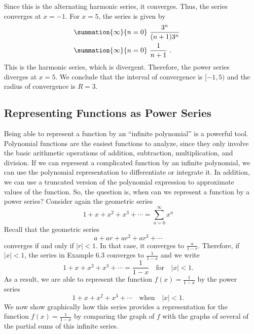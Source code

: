\documentclass{report}
\begin{document}
    \bigbreak \noindent 
    Since this is the alternating harmonic series, it converges. Thus, the series converges at  $x=-1$. For $x=5$, the series is given by
    \begin{align*}
        &\summation{\infty}{n=0}\ \frac{3^{n}}{(n+1)3^{n}}\  \\
        &\summation{\infty}{n=0}\ \frac{1}{n+1}\ 
    .\end{align*}
    This is the harmonic series, which is divergent. Therefore, the power series diverges at \( x = 5 \). We conclude that the interval of convergence is \([ -1, 5 )\) and the radius of convergence is \( R = 3 \).

    \bigbreak \noindent 
    \subsection*{Representing Functions as Power Series}
    \bigbreak \noindent 
    Being able to represent a function by an “infinite polynomial” is a powerful tool. Polynomial functions are the easiest functions to analyze, since they only involve the basic arithmetic operations of addition, subtraction, multiplication, and division. If we can represent a complicated function by an infinite polynomial, we can use the polynomial representation to differentiate or integrate it. In addition, we can use a truncated version of the polynomial expression to approximate values of the function. So, the question is, when can we represent a function by a power series?
    \bigbreak \noindent 
    Consider again the geometric series
\begin{equation}
    1 + x + x^2 + x^3 + \cdots = \sum_{n=0}^{\infty} x^n 
\end{equation}
Recall that the geometric series
\[
    a + ar + ar^2 + ar^3 + \cdots
\]
converges if and only if \( |r| < 1 \). In that case, it converges to \(\frac{a}{1 - r}\). Therefore, if \( |x| < 1 \), the series in Example 6.3 converges to \(\frac{1}{1 - x}\) and we write
\[
    1 + x + x^2 + x^3 + \cdots = \frac{1}{1 - x} \quad \text{for} \quad |x| < 1.
\]
As a result, we are able to represent the function \( f(x) = \frac{1}{1 - x} \) by the power series
\[
    1 + x + x^2 + x^3 + \cdots \quad \text{when} \quad |x| < 1.
\]
We now show graphically how this series provides a representation for the function \( f(x) = \frac{1}{1 - x} \) by comparing the graph of \( f \) with the graphs of several of the partial sums of this infinite series.
\end{document}
